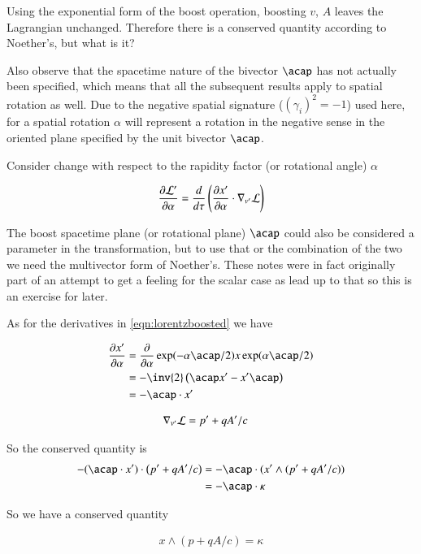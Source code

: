 \documentclass{article}      %
\begin{document}
Using the exponential form of the boost operation, boosting $v$, $A$ leaves the Lagrangian unchanged.
Therefore there is a conserved quantity according to Noether's, but what is it?

Also observe that the spacetime nature of the bivector $\acap$ has not actually been specified, which means that all the
subsequent results apply to spatial rotation as well.  Due to the negative spatial signature ($(\gamma_i)^2=-1$) used here, for a spatial rotation $\alpha$ will represent a rotation in the negative sense in the oriented plane specified by the unit bivector $\acap$.

Consider change with respect to the rapidity factor (or rotational angle) $\alpha$

\begin{align}\label{eqn:lorentzboosted}
\frac{\partial {\mathcal{L}'}}{\partial {\alpha}} = \frac{d}{d\tau} \left( \frac{\partial {x'}}{\partial {\alpha}} \cdot \nabla_{v'} \mathcal{L} \right)
\end{align}

The boost spacetime plane (or rotational plane) $\acap$ could also be considered a parameter in the transformation, but to use that or the combination of the
two we need the multivector form of Noether's.  These notes were in fact originally part of an attempt \cite{PJEulerLagrange}
to get a feeling for the scalar case as lead up to that so this is an exercise for later.

As for the derivatives in \ref{eqn:lorentzboosted} we have

\begin{align*}
\PD{\alpha}{x'} 
&= \PD{\alpha}{} \exp(-\alpha \acap/2) x \exp(\alpha \acap/2) \\
&= -\inv{2} \left(\acap x' - x'\acap\right) \\
&= - \acap \cdot x' \\
\end{align*}

\begin{align*}
\nabla_{v'} \mathcal{L} &= p' + qA'/c
\end{align*}

So the conserved quantity is
\begin{align*}
- (\acap \cdot x') \cdot \left( p' + qA'/c \right)
&= - \acap \cdot (x' \wedge (p' + qA'/c ) ) \\
&= -\acap \cdot \kappa
\end{align*}

So we have a conserved quantity

\begin{align*}
x \wedge (p + qA/c ) = \kappa
\end{align*}
\end{document}
